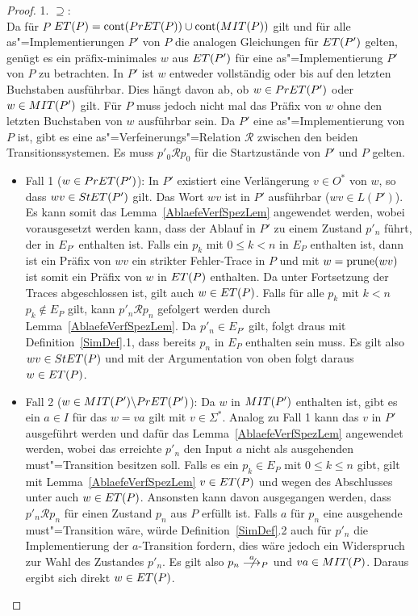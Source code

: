 \begin{proof}
  1. \glqq$\supseteq$\grqq{}:\\
  Da für $P$ $ET (P) = \mathrm{cont} (PrET (P)) \cup \mathrm{cont} (MIT (P))$ gilt und für
  alle as"=Implementierungen $P'$ von $P$ die analogen Gleichungen für $ET
  (P')$ gelten, genügt es ein präfix-minimales $w$ aus $ET (P')$ für eine
  as"=Implementierung $P'$ von $P$ zu betrachten. In $P'$ ist $w$ entweder
  vollständig oder bis auf den letzten Buchstaben ausführbar. Dies hängt davon
  ab, ob $w\in PrET (P')$ oder $w\in MIT (P')$ gilt. Für $P$ muss jedoch
  nicht mal das Präfix von $w$ ohne den letzten Buchstaben von $w$ ausführbar
  sein. Da $P'$ eine as"=Implementierung von $P$ ist, gibt es eine
  as"=Verfeinerungs"=Relation $\mathcal{R}$ zwischen den beiden
  Transitionssystemen. Es muss $p'_0\mathcal{R}p_0$ für die Startzustände von
  $P'$ und $P$ gelten.
  \begin{itemize}
    \item Fall 1 ($w\in PrET (P')$): In $P'$ existiert eine Verlängerung $v\in
      O^*$ von $w$, so dass $wv\in StET (P')$ gilt. Das Wort $wv$ ist in $P'$
      ausführbar ($wv\in L(P')$). Es kann somit das
      Lemma~\ref{AblaefeVerfSpezLem} angewendet werden, wobei
      vorausgesetzt werden kann, dass der Ablauf in $P'$ zu einem Zustand
      $p'_n$ führt, der in $E_{P'}$ enthalten ist. Falls ein $p_k$ mit $0\leq k
      < n$ in $E_P$ enthalten ist, dann ist ein Präfix von $wv$ ein strikter
      Fehler-Trace in $P$ und mit $w=\mathrm{prune}(wv)$ ist somit ein Präfix von $w$
      in $ET (P)$ enthalten. Da \ET{} unter Fortsetzung der Traces
      abgeschlossen ist, gilt auch $w\in ET (P)$. Falls für alle $p_k$ mit $k
      < n$ $p_k\notin E_P$ gilt, kann $p'_n \mathcal{R} p_n$ gefolgert werden
      durch Lemma~\ref{AblaefeVerfSpezLem}. Da $p'_n\in E_{P'}$ gilt, folgt
      draus mit Definition~\ref{SimDef}.1, dass bereits $p_n$ in $E_P$
      enthalten sein muss. Es gilt also $wv\in StET (P)$ und mit der
      Argumentation von oben folgt daraus $w\in ET (P)$.
    \item Fall 2 ($w\in MIT (P')\backslash PrET (P')$): Da $w$ in $MIT (P')$
      enthalten ist, gibt es ein $a\in I$ für das $w=va$ gilt mit $v\in\Sigma
      ^*$. Analog zu Fall 1 kann das $v$ in $P'$ ausgeführt werden und dafür
      das Lemma~\ref{AblaefeVerfSpezLem} angewendet werden, wobei das
      erreichte $p'_n$ den Input $a$ nicht als ausgehenden must"=Transition
      besitzen soll. Falls es ein $p_k\in E_P$ mit $0\leq k \leq n$ gibt, gilt
      mit Lemma~\ref{AblaefeVerfSpezLem} $v\in ET (P)$ und wegen des
      Abschlusses unter \cont{} auch $w\in ET (P)$. Ansonsten kann davon
      ausgegangen werden, dass $p'_n \mathcal{R} p_n$ für einen Zustand $p_n$
      aus $P$ erfüllt ist. Falls $a$ für $p_n$ eine ausgehende must"=Transition
      wäre, würde Definition~\ref{SimDef}.2 auch für $p'_n$ die Implementierung
      der $a$-Transition fordern, dies wäre jedoch ein Widerspruch zur Wahl des
      Zustandes $p'_n$. Es gilt also $p_n\nmust[a]_P$ und $va\in MIT (P)$.
      Daraus ergibt sich direkt $w\in ET (P)$.
  \end{itemize}


\end{proof}
